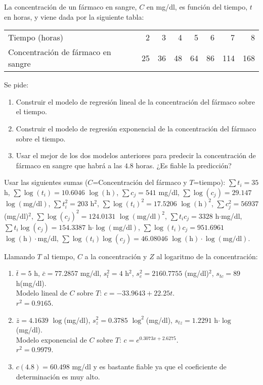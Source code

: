 {La concentración de un fármaco en sangre, $C$ en mg/dl, es función del tiempo, $t$ en horas, y viene dada por la siguiente tabla: 
\begin{center}
\begin{tabular}{lrrrrrrr}
\toprule
Tiempo (horas) & 2 & 3 & 4 & 5 & 6 & 7 & 8\\
Concentración de fármaco en sangre & 25 & 36 & 48 & 64 & 86 & 114 & 168\\
\bottomrule
\end{tabular}
\end{center}
Se pide:
\begin{enumerate}
\item Construir el modelo de regresión lineal de la concentración del fármaco sobre el tiempo.
\item Construir el modelo de regresión exponencial de la concentración del fármaco sobre el tiempo.
\item Usar el mejor de los dos modelos anteriores para predecir la concentración de fármaco en sangre que habrá a las $4.8$ horas.
¿Es fiable la predicción?
\end{enumerate}

Usar las siguientes sumas ($C$=Concentración del fármaco y $T$=tiempo): $\sum t_i=35$ h, $\sum \log(t_i)=10.6046$
$\log(\mbox{h})$, $\sum c_j=541$ mg/dl, $\sum \log(c_j)= 29.147$ $\log(\mbox{mg/dl})$, $\sum t_i^2=203$ h$^2$,
$\sum \log(t_i)^2=17.5206$ $\log(\mbox{h})^2$, $\sum c_j^2=56937$ (mg/dl)$^2$, $\sum \log(c_j)^2=124.0131$
$\log(\mbox{mg/dl})^2$, $\sum t_ic_j=3328$ h$\cdot$mg/dl, $\sum t_i\log(c_j)=154.3387$
h$\cdot\log(\mbox{mg/dl})$, $\sum \log(t_i)c_j=951.6961$ $\log(\mbox{h})\cdot$mg/dl, $\sum
\log(t_i)\log(c_j)=46.08046$ $\log(\mbox{h})\cdot\log(\mbox{mg/dl})$.
}
{Llamando $T$ al tiempo, $C$ a la concentración y $Z$ al logaritmo de la concentración:
\begin{enumerate}
\item $\bar t=5$ h, $\bar c=77.2857$ mg/dl, $s_t^2=4$ h$^2$,  $s_c^2=2160.7755$ (mg/dl)$^2$, $s_{tc}=89$ h(mg/dl).\\
Modelo lineal de $C$ sobre $T$: $c=-33.9643+22.25t$.\\
$r^2=0.9165$.
\item  $\bar z=4.1639$ $\log$(mg/dl), $s_z^2=0.3785$ $\log^2$(mg/dl),
$s_{tz}=1.2291$ h$\cdot\log$(mg/dl).\\
Modelo exponencial de $C$ sobre $T$: $c=e^{0.3073x+2.6275}$.\\
$r^2=0.9979$.
\item $c(4.8)= 60.498$ mg/dl y es bastante fiable ya que el coeficiente de determinación es muy alto.
\end{enumerate}
}

